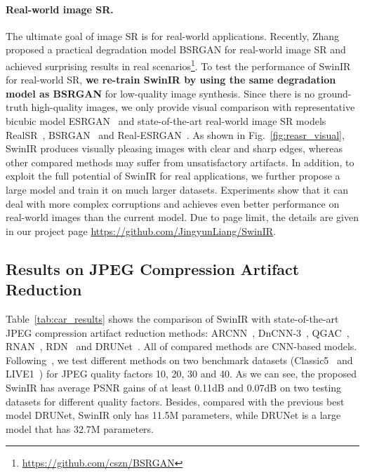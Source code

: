 \documentclass[10pt,twocolumn,letterpaper]{article}
\newlength \g
\begin{document}
\vspace{-4mm}
\paragraph{Real-world image SR.} The ultimate goal of image SR is for real-world applications. Recently, Zhang~\etal~\cite{kai2021bsrgan} proposed a practical degradation model BSRGAN for real-world image SR and achieved surprising results in real scenarios\footnote{\url{https://github.com/cszn/BSRGAN}}. To test the performance of SwinIR for real-world SR, \textbf{we re-train SwinIR by using the same degradation model as BSRGAN} for low-quality image synthesis. Since there is no ground-truth high-quality images, we only provide visual comparison with representative bicubic model ESRGAN~\cite{wang2018esrgan} and state-of-the-art real-world image SR models RealSR~\cite{ji2020realsr}, BSRGAN~\cite{kai2021bsrgan} and Real-ESRGAN~\cite{wang2021realESRGAN}. As shown in Fig.~\ref{fig:reasr_visual}, SwinIR produces visually pleasing images with clear and sharp edges, whereas other compared methods may suffer from unsatisfactory artifacts. In addition, to exploit the full potential of SwinIR for real applications, we further propose a large model and train it on much larger datasets. Experiments show that it can deal with more complex corruptions and achieves even better performance on real-world images than the current model. Due to page limit, the details are given in our project page \url{https://github.com/JingyunLiang/SwinIR}.




\subsection{Results on JPEG Compression Artifact Reduction}
Table~\ref{tab:car_results} shows the comparison of SwinIR with state-of-the-art JPEG compression artifact reduction methods: ARCNN~\cite{dong2015compression}, DnCNN-3~\cite{zhang2017DnCNN}, QGAC~\cite{ehrlich2020quantization}, RNAN~\cite{zhang2019RNAN}, RDN~\cite{zhang2020RDNIR} and DRUNet~\cite{zhang2021DPIR}. All of compared methods are CNN-based models. Following~\cite{zhang2020RDNIR, zhang2021DPIR}, we test different methods on two benchmark datasets (Classic5~\cite{foi2007Classic5} and LIVE1~\cite{sheikh2005live}) for JPEG quality factors 10, 20, 30 and 40. As we can see, the proposed SwinIR has average PSNR gains of at least 0.11dB and 0.07dB on two testing datasets for different quality factors. Besides, compared with the previous best model DRUNet, SwinIR only has 11.5M parameters, while DRUNet is a large model that has 32.7M parameters.
\end{document}
